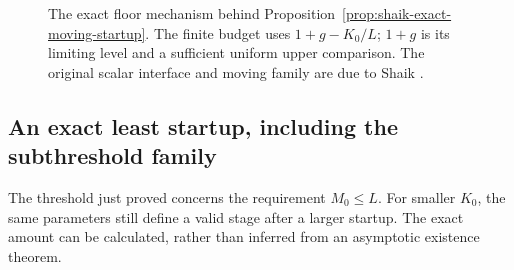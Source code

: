 \documentclass[11pt]{article}
\theoremstyle{remark}\newtheorem{remark}[proposition]{Remark}
\begin{document}
\begin{figure}[ht]
\centering
{}
\caption{The exact floor mechanism behind
Proposition~\ref{prop:shaik-exact-moving-startup}. The finite budget uses
\(1+g-K_0/L\); \(1+g\) is its limiting level and a sufficient uniform
upper comparison. The original scalar interface and moving family
are due to Shaik \cite{Shaik2026v324}.}
\end{figure}

\subsection{An exact least startup, including the subthreshold family}

The threshold just proved concerns the requirement \(M_0\le L\).
For smaller \(K_0\), the same parameters still define a valid stage
after a larger startup. The exact amount can be calculated, rather
than inferred from an asymptotic existence theorem.
\end{document}
